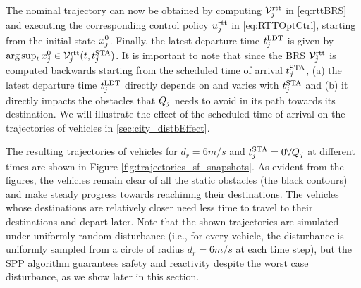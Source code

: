 The nominal trajectory can now be obtained by computing $\mathcal{V}_j^\text{rtt}$ in \eqref{eq:rttBRS} and executing the corresponding control policy $u_j^\text{rtt}$ in \eqref{eq:RTTOptCtrl}, starting from the initial state $x^0_j$. Finally, the latest departure time $t^\text{LDT}_j$ is given by $\arg \sup_t x^0_j \in \mathcal{V}_j^\text{rtt}(t, t^\text{STA}_j)$. It is important to note that since the BRS $\mathcal{V}_j^\text{rtt}$ is computed backwards starting from the scheduled time of arrival $t^\text{STA}_j$, (a) the latest departure time $t^\text{LDT}_j$ directly depends on and varies with $t^\text{STA}_j$ and (b) it directly impacts the obstacles that $Q_j$ needs to avoid in its path towards its destination. We will illustrate the effect of the scheduled time of arrival on the trajectories of vehicles in \ref{sec:city_distbEffect}.

The resulting trajectories of vehicles for $d_{r} = 6 m/s$ and $t^\text{STA}_j = 0 \forall Q_j$ at different times are shown in Figure \ref{fig:trajectories_sf_snapshots}. As evident from the figures, the vehicles remain clear of all the static obstacles (the black contours) and make steady progress towards reachinmg their destinations. The vehicles whose destinations are relatively closer need less time to travel to their destinations and depart later. Note that the shown trajectories are simulated under uniformly random disturbance (i.e., for every vehicle, the disturbance is uniformly sampled from a circle of radius $d_{r} = 6 m/s$ at each time step), but the SPP algorithm guarantees safety and reactivity despite the worst case disturbance, as we show later in this section.
%
